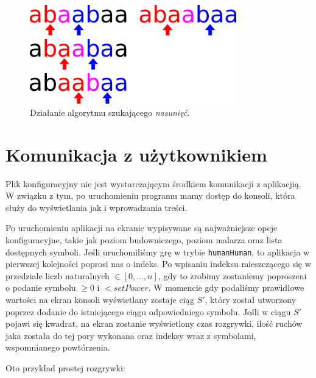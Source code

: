 \documentclass[document]{xmgr}
\begin{document}
\begin{figure}[tbh]
    \centering
    \includegraphics[width = 0.8\textwidth]{images/overlapFinding}
    \caption{Działanie algorytmu szukającego \emph{nasunięć}.}
    \label{fig:overlapFinding}
\end{figure}

\section{Komunikacja z użytkownikiem}
Plik konfiguracyjny nie jest wystarczającym środkiem komunikacji z aplikacjią. W związku z tym, po uruchomieniu programu mamy dostęp do konsoli, która służy do wyświetlania jak i wprowadzania treści.

Po uruchomieniu aplikacji na ekranie wypisywane są najważniejsze opcje konfiguracyjne, takie jak poziom budowniczego, poziom malarza oraz lista dostępnych symboli. Jeśli uruchomiliśmy grę w trybie \texttt{humanHuman}, to aplikacja w pierwszej kolejności poprosi nas o indeks. Po wpisaniu indeksu mieszczącego się w przedziale liczb naturalnych $\in [0,...,n]$, gdy to zrobimy zostaniemy poproszeni o podanie symbolu $\geq 0$ i $< setPower$. W momencie gdy podaliśmy prawidłowe wartości na ekran konsoli wyświetlany zostaje ciąg $S'$, który został utworzony poprzez dodanie do istniejącego ciągu odpowiedniego symbolu. Jeśli w ciągu $S'$ pojawi się kwadrat, na ekran zostanie wyświetlony czas rozgrywki, ilość ruchów jaka została do tej pory wykonana oraz indeksy wraz z symbolami, wspomnianego powtórzenia.

Oto przykład prostej rozgrywki:
\end{document}
